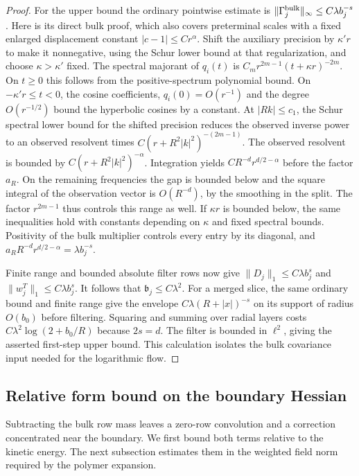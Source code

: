 \documentclass[11pt]{article}
\theoremstyle{definition}
\begin{document}
\begin{proof}
For the upper bound the ordinary pointwise estimate is
\(\|\Gamma_j^{\rm bulk}\|_\infty\le C\lambda b_j^{-s}\).
Here is its direct bulk proof, which also covers preterminal scales
with a fixed enlarged displacement constant
\(|c-1|\le C r^\alpha\). Shift the auxiliary precision by
\(\kappa' r\) to make it nonnegative, using the Schur lower bound
at that regularization, and choose \(\kappa>\kappa'\) fixed.
The spectral majorant of \(q_i(t)\) is
\(C_m r^{2m-1}(t+\kappa r)^{-2m}\). On \(t\ge0\) this follows
from the positive-spectrum polynomial bound. On
\(-\kappa' r\le t<0\), the cosine coefficients, \(q_i(0)=O(r^{-1})\)
and the degree \(O(r^{-1/2})\) bound the hyperbolic cosines by a
constant. At \(|Rk|\le c_1\), the Schur spectral lower bound for
the shifted precision reduces the observed inverse power to
an observed resolvent times \(C(r+R^2|k|^2)^{-(2m-1)}\).
The observed resolvent is bounded by
\(C(r+R^2|k|^2)^{-\alpha}\).
Integration yields \(C R^{-d} r^{d/2-\alpha}\) before the
factor \(a_R\). On the remaining frequencies the gap is
bounded below and the square integral of the observation
vector is \(O(R^{-d})\), by the smoothing in the split.
The factor \(r^{2m-1}\) thus controls this range as well.
If \(\kappa r\) is bounded below, the same inequalities
hold with constants depending on \(\kappa\) and fixed spectral bounds.
Positivity of the bulk multiplier controls every entry by its
diagonal, and \(a_R R^{-d}r^{d/2-\alpha}=\lambda b_j^{-s}\).

Finite range and bounded absolute filter rows now give
\(\|D_j\|_1\le C\lambda b_j^s\) and
\(\|w_j^T\|_1\le C\lambda b_j^s\).
It follows that \(\mathfrak b_j\le C\lambda^2\).
For a merged slice, the same ordinary bound and finite range
give the envelope \(C\lambda(R+|x|)^{-s}\) on its support of
radius \(O(b_0)\) before filtering. Squaring and summing over
radial layers costs \(C\lambda^2\log(2+b_0/R)\) because \(2s=d\).
The filter is bounded in \(\ell^2\), giving the asserted
first-step upper bound. This calculation isolates the bulk
covariance input needed for the logarithmic flow.
\end{proof}

\subsection{Relative form bound on the boundary Hessian}

Subtracting the bulk row mass leaves a zero-row convolution and
a correction concentrated near the boundary. We first bound both
terms relative to the kinetic energy. The next subsection estimates
them in the weighted field norm required by the polymer expansion.
\end{document}

